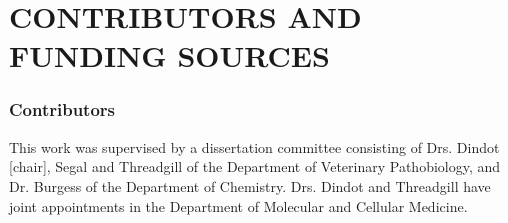 %
%
%
%






\chapter*{CONTRIBUTORS AND FUNDING SOURCES}

\subsection*{Contributors}
This work was supervised by a dissertation committee consisting of Drs. Dindot [chair], Segal and Threadgill of the Department of Veterinary Pathobiology, and Dr. Burgess of the Department of Chemistry. Drs. Dindot and Threadgill have joint appointments in the Department of Molecular and Cellular Medicine.

